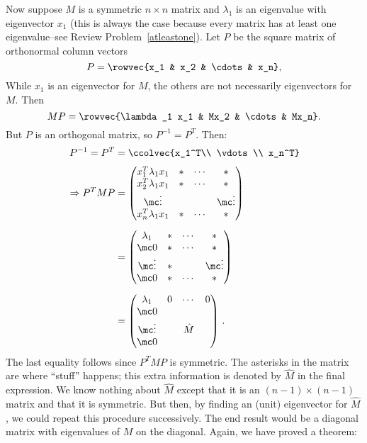 Now suppose $M$ is a symmetric $n\times n$ matrix and $\lambda_1$ is an eigenvalue with eigenvector $x_1$ (this is always the case because every matrix has at least one eigenvalue--see Review Problem~\ref{atleastone}).  
Let $P$ be the square matrix of orthonormal column vectors 
\[
P=\rowvec{x_1 & x_2 & \cdots & x_n},
\]
While $x_1$ is an eigenvector for $M$, the others are not necessarily eigenvectors for $M$.  
Then
\[
MP=\rowvec{\lambda_1 x_1 & Mx_2 & \cdots & Mx_n}.
\]
But $P$ is an orthogonal matrix, so $P^{-1}=P^T$.  Then:
\begin{align*}
P^{-1}=P^T &= \ccolvec{x_1^T\\ \vdots \\ x_n^T} \\[1mm]
\Rightarrow P^TMP &= \begin{pmatrix}
  x_1^T\lambda_1x_1  & * & \cdots & *\\
  x_2^T\lambda_1x_1  & * & \cdots & *\\
  \mc\vdots             &   & & \mc\vdots\\
   x_n^T\lambda_1x_1 & * & \cdots & *\\
  \end{pmatrix}\\[2mm]
&= \begin{pmatrix}
  \lambda_1  & * & \cdots & *\\
  \mc 0  & * & \cdots & *\\
 \mc \vdots             & *  & & \mc\vdots\\
  \mc 0 & * & \cdots & *\\
  \end{pmatrix}\\[2mm]
&= \begin{pmatrix}
  \lambda_1  & 0 & \cdots & 0\\
  \mc 0          & & & \\
  \mc\vdots     & & \hat{M} & \\
  \mc0          & & & \\
  \end{pmatrix}\, .\\
\end{align*}
The last equality follows since $P^TMP$ is symmetric.  The asterisks in the matrix are where ``stuff'' happens; this extra information is denoted by $\hat{M}$ in the final expression.  We know nothing about $\hat{M}$ except that it is an $(n-1)\times (n-1)$ matrix and that it is symmetric.  But then, by finding an (unit) eigenvector for $\hat{M}$, we could repeat this procedure successively.  The end result would be a diagonal matrix with eigenvalues of $M$ on the diagonal. Again, we have proved a theorem: %

